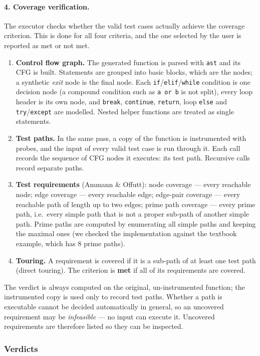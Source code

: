 \documentclass[12pt, a4paper]{article}
\begin{document}
\paragraph{4. Coverage verification.} The executor checks whether the valid test cases actually achieve the coverage criterion. This is done for all four criteria, and the one selected by the user is reported as met or not met.
\begin{enumerate}
    \item \textbf{Control flow graph.} The generated function is parsed with \texttt{ast} and its CFG is built. Statements are grouped into basic blocks, which are the nodes; a synthetic \emph{exit} node is the final node. Each \texttt{if}/\texttt{elif}/\texttt{while} condition is one decision node (a compound condition such as \texttt{a or b} is not split), every loop header is its own node, and \texttt{break}, \texttt{continue}, \texttt{return}, loop \texttt{else} and \texttt{try}/\texttt{except} are modelled. Nested helper functions are treated as single statements.
    \item \textbf{Test paths.} In the same pass, a copy of the function is instrumented with probes, and the input of every valid test case is run through it. Each call records the sequence of CFG nodes it executes: its test path. Recursive calls record separate paths.
    \item \textbf{Test requirements} (Ammann \& Offutt): node coverage --- every reachable node; edge coverage --- every reachable edge; edge-pair coverage --- every reachable path of length up to two edges; prime path coverage --- every prime path, i.e.\ every simple path that is not a proper sub-path of another simple path. Prime paths are computed by enumerating all simple paths and keeping the maximal ones (we checked the implementation against the textbook example, which has 8 prime paths).
    \item \textbf{Touring.} A requirement is covered if it is a sub-path of at least one test path (direct touring). The criterion is \textbf{met} if all of its requirements are covered.
\end{enumerate}
The verdict is always computed on the original, un-instrumented function; the instrumented copy is used only to record test paths. Whether a path is executable cannot be decided automatically in general, so an uncovered requirement may be \emph{infeasible} --- no input can execute it. Uncovered requirements are therefore listed so they can be inspected.

\subsubsection{Verdicts}
\end{document}
